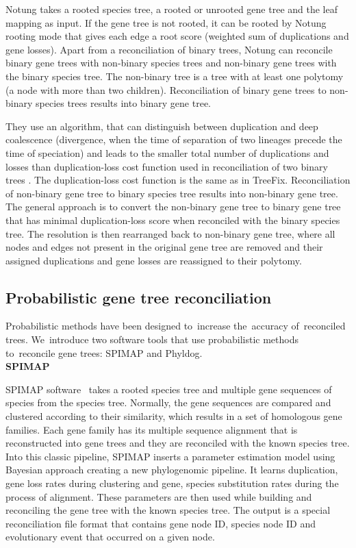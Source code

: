 Notung \cite{notung} takes a rooted species tree, a rooted or unrooted gene tree and the leaf mapping as input. If the gene tree is not rooted, it can be rooted by Notung rooting mode that gives each edge a root score (weighted sum of duplications and gene losses). Apart from a reconciliation of binary trees, Notung can reconcile binary gene trees with non-binary species trees and non-binary gene trees with the binary species tree. The non-binary tree is a tree with at least one polytomy (a node with more than two children). Reconciliation of binary gene trees to non-binary species trees results into binary gene tree.

They use an algorithm, that can distinguish between duplication and deep coalescence (divergence, when the time of separation of two lineages precede the time of speciation) and leads to the smaller total number of duplications and losses than duplication-loss cost function used in reconciliation of two binary trees \cite{vernot}. The duplication-loss cost function is the same as in TreeFix. Reconciliation of non-binary gene tree to binary species tree results into non-binary gene tree. The general approach is to convert the non-binary gene tree to binary gene tree that has minimal duplication-loss score when reconciled with the binary species tree. The resolution is then rearranged back to non-binary gene tree, where all nodes and edges not present in the original gene tree are removed and their assigned duplications and gene losses are reassigned to their polytomy.

\subsection{Probabilistic gene tree reconciliation}
Probabilistic methods have been designed to~increase the~accuracy of~reconciled trees. We~introduce two software tools that use probabilistic methods to~reconcile gene trees: SPIMAP and Phyldog.\\
\textbf{SPIMAP}

SPIMAP software~\cite{spimap_online} takes a rooted species tree and multiple gene sequences of species from the species tree. Normally, the gene sequences are compared and clustered according to their similarity, which results in a set of homologous gene families. Each gene family has its multiple sequence alignment that is reconstructed into gene trees and they are reconciled with the known species tree. Into this classic pipeline, SPIMAP inserts a parameter estimation model using Bayesian approach creating a new phylogenomic pipeline. It learns duplication, gene loss rates during clustering and gene, species substitution rates during the process of alignment. These parameters are then used while building and reconciling the gene tree with the known species tree. The output is a special reconciliation file format that contains gene node ID, species node ID and evolutionary event that occurred on a given node.

